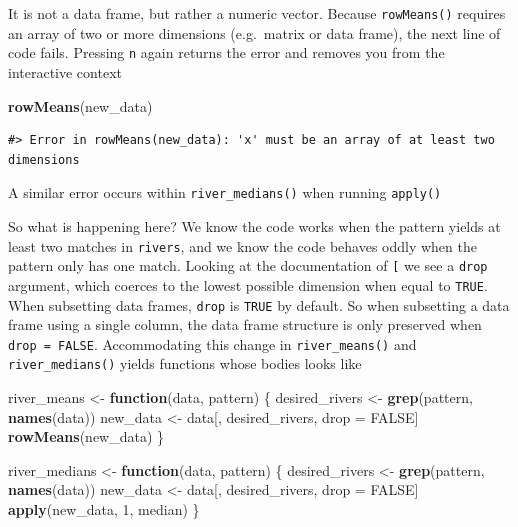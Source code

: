 \documentclass[
]{book}
\newenvironment{Shaded}{\begin{snugshade}}{\end{snugshade}}
\newcommand{\ControlFlowTok}[1]{\textcolor[rgb]{0.13,0.29,0.53}{\textbf{#1}}}
\newcommand{\DecValTok}[1]{\textcolor[rgb]{0.00,0.00,0.81}{#1}}
\newcommand{\KeywordTok}[1]{\textcolor[rgb]{0.13,0.29,0.53}{\textbf{#1}}}
\newcommand{\NormalTok}[1]{#1}
\newcommand{\OtherTok}[1]{\textcolor[rgb]{0.56,0.35,0.01}{#1}}
\newcommand{\StringTok}[1]{\textcolor[rgb]{0.31,0.60,0.02}{#1}}
\begin{document}
It is not a data frame, but rather a numeric vector. Because \texttt{rowMeans()} requires an array of two or more dimensions (e.g.~matrix or data frame), the next line of code fails. Pressing \texttt{n} again returns the error and removes you from the interactive context

\begin{Shaded}
\begin{Highlighting}[]
\KeywordTok{rowMeans}\NormalTok{(new_data)}
\end{Highlighting}
\end{Shaded}

\begin{verbatim}
#> Error in rowMeans(new_data): 'x' must be an array of at least two dimensions
\end{verbatim}

A similar error occurs within \texttt{river\_medians()} when running \texttt{apply()}

So what is happening here? We know the code works when the pattern yields at least two matches in \texttt{rivers}, and we know the code behaves oddly when the pattern only has one match. Looking at the documentation of \texttt{{[}} we see a \texttt{drop} argument, which coerces to the lowest possible dimension when equal to \texttt{TRUE}. When subsetting data frames, \texttt{drop} is \texttt{TRUE} by default. So when subsetting a data frame using a single column, the data frame structure is only preserved when \texttt{drop\ =\ FALSE}. Accommodating this change in \texttt{river\_means()} and \texttt{river\_medians()} yields functions whose bodies looks like

\begin{Shaded}
\begin{Highlighting}[]
\NormalTok{river_means <-}\StringTok{ }\ControlFlowTok{function}\NormalTok{(data, pattern) \{}
\NormalTok{  desired_rivers <-}\StringTok{ }\KeywordTok{grep}\NormalTok{(pattern, }\KeywordTok{names}\NormalTok{(data))}
\NormalTok{  new_data <-}\StringTok{ }\NormalTok{data[, desired_rivers, drop =}\StringTok{ }\OtherTok{FALSE}\NormalTok{]}
  \KeywordTok{rowMeans}\NormalTok{(new_data)}
\NormalTok{\}}

\NormalTok{river_medians <-}\StringTok{ }\ControlFlowTok{function}\NormalTok{(data, pattern) \{}
\NormalTok{  desired_rivers <-}\StringTok{ }\KeywordTok{grep}\NormalTok{(pattern, }\KeywordTok{names}\NormalTok{(data))}
\NormalTok{  new_data <-}\StringTok{ }\NormalTok{data[, desired_rivers, drop =}\StringTok{ }\OtherTok{FALSE}\NormalTok{]}
  \KeywordTok{apply}\NormalTok{(new_data, }\DecValTok{1}\NormalTok{, median)}
\NormalTok{\}}
\end{Highlighting}
\end{Shaded}
\end{document}

